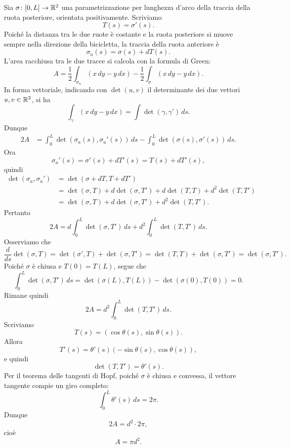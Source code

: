 \documentclass[a4paper]{article}
\begin{document}
\begin{snippetsolution}{}
    Sia \(\sigma\colon[0,L]\to\mathbb{R}^2\)
    una parametrizzazione per lunghezza d'arco della traccia della ruota posteriore, orientata positivamente. Scriviamo
    \[
        T(s)=\sigma'(s).
    \]
    Poiché la distanza tra le due ruote è costante e la ruota posteriore si muove sempre nella direzione della bicicletta, la traccia della ruota anteriore è
    \[
        \sigma_a(s)=\sigma(s)+dT(s).
    \]
    L'area racchiusa tra le due tracce si calcola con la formula di Green:
    \[
        A=\frac12\int_{\sigma_a}(x\,dy-y\,dx)-\frac12\int_{\sigma}(x\,dy-y\,dx).
    \]
    In forma vettoriale, indicando con \(\det(u,v)\) il determinante dei due vettori \(u,v\in\mathbb{R}^2\), si ha
    \[
        \int_{\gamma}(x\,dy-y\,dx)=\int \det(\gamma,\gamma')\,ds.
    \]
    Dunque
    \begin{align*}
        2A
        &=
        \int_0^L \det(\sigma_a(s),\sigma_a'(s))\,ds
        -
        \int_0^L \det(\sigma(s),\sigma'(s))\,ds.
    \end{align*}
    Ora
    \[
        \sigma_a'(s)=\sigma'(s)+dT'(s)=T(s)+dT'(s),
    \]
    quindi
    \begin{align*}
        \det(\sigma_a,\sigma_a')
        &=
        \det(\sigma+dT,T+dT')\\
        &=
        \det(\sigma,T)+d\det(\sigma,T')+d\det(T,T)+d^2\det(T,T')\\
        &=
        \det(\sigma,T)+d\det(\sigma,T')+d^2\det(T,T').
    \end{align*}
    Pertanto
    \[
        2A
        =
        d\int_0^L \det(\sigma,T')\,ds
        +
        d^2\int_0^L \det(T,T')\,ds.
    \]
    Osserviamo che
    \[
        \frac{d}{ds}\det(\sigma,T)
        =
        \det(\sigma',T)+\det(\sigma,T')
        =
        \det(T,T)+\det(\sigma,T')
        =
        \det(\sigma,T').
    \]
    Poiché \(\sigma\) è chiusa e \(T(0)=T(L)\), segue che
    \[
        \int_0^L \det(\sigma,T')\,ds
        =
        \det(\sigma(L),T(L))-\det(\sigma(0),T(0))
        =
        0.
    \]
    Rimane quindi
    \[
        2A=d^2\int_0^L \det(T,T')\,ds.
    \]
    Scriviamo
    \[
        T(s)=(\cos\theta(s),\sin\theta(s)).
    \]
    Allora
    \[
        T'(s)=\theta'(s)(-\sin\theta(s),\cos\theta(s)),
    \]
    e quindi
    \[
        \det(T,T')=\theta'(s).
    \]
    Per il teorema delle tangenti di Hopf, poiché \(\sigma\) è chiusa e convessa, il vettore tangente compie un giro completo:
    \[
        \int_0^L \theta'(s)\,ds=2\pi.
    \]
    Dunque
    \[
        2A=d^2\cdot 2\pi,
    \]
    cioè
    \[
        A=\pi d^2.
    \]
\end{snippetsolution}
\end{document}
